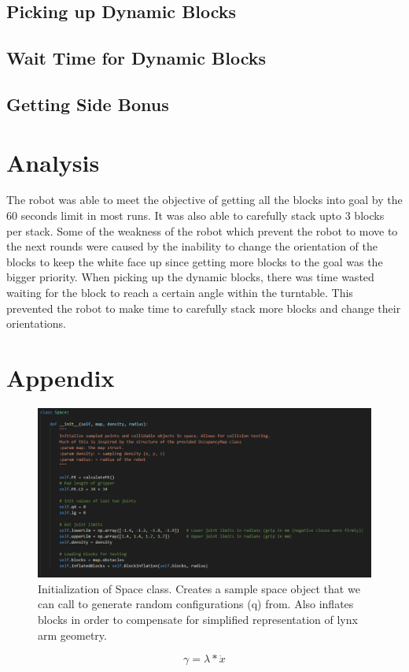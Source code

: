 \documentclass{article}
\begin{document}
     \subsection{Picking up Dynamic Blocks}
     
     \subsection{Wait Time for Dynamic Blocks}

     \subsection{Getting Side Bonus}


\section{Analysis}
The robot was able to meet the objective of getting all the blocks into goal by the 60 seconds limit in most runs. It was also able to carefully stack upto 3 blocks per stack. Some of the weakness of the robot which prevent the robot to move to the next rounds were caused by the inability to change the orientation of the blocks to keep the white face up since getting more blocks to the goal was the bigger priority. When picking up the dynamic blocks, there was time wasted waiting for the block to reach a certain angle within the turntable. This prevented the robot to make time to carefully stack more blocks and change their orientations. 


\section{Appendix}

\begin{figure}[h]
\centering
\includegraphics[scale=.6]{Fig1.png}
\caption{Initialization of Space class.  Creates a sample space object that we can call to generate random configurations (q) from.  Also inflates blocks in order to compensate for simplified representation of lynx arm geometry.}
\label{fig1}
\end{figure}


  \begin{equation}
      \gamma = \lambda* \dot{x}
  \end{equation}
\end{document}
